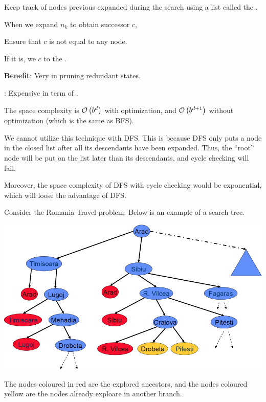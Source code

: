 \begin{listu}
    \item Keep track of  nodes previous expanded during the search using a list called the .

    \item When we expand $n_k$ to obtain successor $c$,

    \begin{listu}
        \item Ensure that $c$ is not equal to any  node.
        \item If it is, we  $c$ to the \Frontier.
    \end{listu}

    \item {\color{darkGreen}\textbf{Benefit}:} Very  in pruning redundant states.

    \item {}: Expensive in term of .

    The space complexity is $\mathcal{O}\left(b^{d}\right)$ with optimization, and $\mathcal{O}\left(b^{d+1}\right)$ without optimization (which is the same as BFS).
\end{listu}

\begin{remark}
    We cannot utilize this technique with DFS. This is because DFS only puts a node in the closed list after all its descendants have been expanded. Thus, the ``root'' node will be put on the list later than its descendants, and cycle checking will fail.

    Moreover, the space complexity of DFS with cycle checking would be exponential, which will loose the advantage of DFS.
\end{remark}

\begin{example}
    Consider the Romania Travel problem. Below is an example of a search tree.

    \begin{center}
        \includegraphics[width=0.67\linewidth]{figures/cycle-checking.png}
    \end{center}

    The nodes coloured in red are the explored ancestors, and the nodes coloured yellow are the nodes already exploare in another branch.
\end{example}


